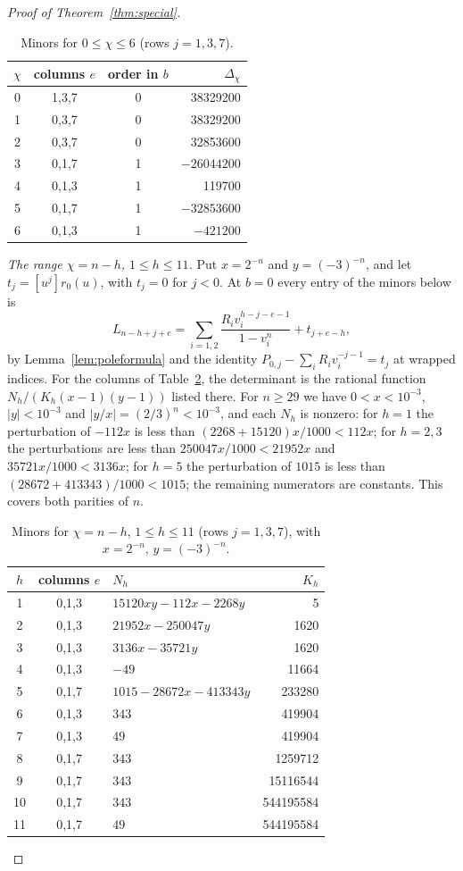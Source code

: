 \documentclass{amsart}
\theoremstyle{definition}
\theoremstyle{remark}
\numberwithin{equation}{section}
\begin{document}
\begin{proof}[Proof of Theorem~\ref{thm:special}]
\begin{table}[ht]
\caption{Minors for $0\le\chi\le6$ (rows $j=1,3,7$).}\label{tab:nonneg}
\begin{tabular}{cccr}
\toprule
$\chi$ & columns $e$ & order in $b$ & $\Delta_\chi$\\
\midrule
0&1,3,7&0&38329200\\
1&0,3,7&0&38329200\\
2&0,3,7&0&32853600\\
3&0,1,7&1&$-26044200$\\
4&0,1,3&1&119700\\
5&0,1,7&1&$-32853600$\\
6&0,1,3&1&$-421200$\\
\bottomrule
\end{tabular}
\end{table}

\emph{The range $\chi=n-h$, $1\le h\le11$.} Put $x=2^{-n}$ and $y=(-3)^{-n}$, and let
$t_j=[u^j]r_0(u)$, with $t_j=0$ for $j<0$. At $b=0$ every entry of the minors below is
\[
  L_{n-h+j+e}=\sum_{i=1,2}\frac{R_iv_i^{h-j-e-1}}{1-v_i^n}+t_{j+e-h},
\]
by Lemma~\ref{lem:poleformula} and the identity $P_{0,j}-\sum_iR_iv_i^{-j-1}=t_j$ at
wrapped indices. For the columns of Table~\ref{tab:neg}, the determinant is the
rational function $N_h/(K_h(x-1)(y-1))$ listed there. For $n\ge29$ we have
$0<x<10^{-3}$, $|y|<10^{-3}$ and $|y/x|=(2/3)^n<10^{-3}$, and each $N_h$ is nonzero:
for $h=1$ the perturbation of $-112x$ is less than $(2268+15120)x/1000<112x$; for
$h=2,3$ the perturbations are less than $250047x/1000<21952x$ and
$35721x/1000<3136x$; for $h=5$ the perturbation of $1015$ is less than
$(28672+413343)/1000<1015$; the remaining numerators are constants. This covers both
parities of $n$.

\begin{table}[ht]
\caption{Minors for $\chi=n-h$, $1\le h\le11$ (rows $j=1,3,7$), with
$x=2^{-n}$, $y=(-3)^{-n}$.}\label{tab:neg}
\begin{tabular}{cclr}
\toprule
$h$&columns $e$&$N_h$&$K_h$\\
\midrule
1&0,1,3&$15120xy-112x-2268y$&5\\
2&0,1,3&$21952x-250047y$&1620\\
3&0,1,3&$3136x-35721y$&1620\\
4&0,1,3&$-49$&11664\\
5&0,1,7&$1015-28672x-413343y$&233280\\
6&0,1,3&$343$&419904\\
7&0,1,3&$49$&419904\\
8&0,1,7&$343$&1259712\\
9&0,1,7&$343$&15116544\\
10&0,1,7&$343$&544195584\\
11&0,1,7&$49$&544195584\\
\bottomrule
\end{tabular}
\end{table}


\end{proof}
\end{document}
